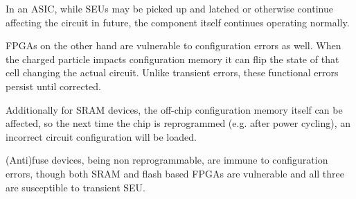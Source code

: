 \documentclass[12pt,final,oneside]{dwThesis} %
\begin{document}
   In an \ac{ASIC}, while \acp{SEU} may be picked up and latched or otherwise continue affecting the circuit in future, the component itself continues operating normally.

   \acp{FPGA} on the other hand are vulnerable to configuration errors as well. When the charged particle impacts configuration memory it can flip the state of that cell changing the actual circuit. Unlike transient errors, these functional errors persist until corrected.

   Additionally for \ac{SRAM} devices, the off-chip configuration memory itself can be affected, so the next time the chip is reprogrammed (e.g. after power cycling), an incorrect circuit configuration will be loaded.

   (Anti)fuse devices, being non reprogrammable, are immune to configuration errors, though both \ac{SRAM} and flash based \acp{FPGA} are vulnerable and all three are susceptible to transient \ac{SEU}\cite{HFPP}.
\end{document}
